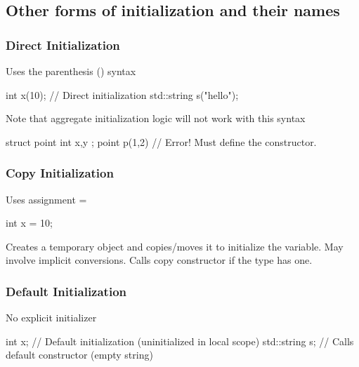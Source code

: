 \documentclass{report}
\begin{document}
    \bigbreak \noindent 
    \subsection{Other forms of initialization and their names}
    \bigbreak \noindent 
    \subsubsection{ Direct Initialization}
    \bigbreak \noindent 
    Uses the parenthesis () syntax
    \bigbreak \noindent 
    \begin{cppcode}
        int x(10);   // Direct initialization
        std::string s("hello");
    \end{cppcode}
    \bigbreak \noindent 
    Note that aggregate initialization logic  will not work with this syntax
    \bigbreak \noindent 
    \begin{cppcode}
        struct point{
            int x,y
        };
        point p(1,2) // Error! Must define the constructor.
    \end{cppcode}

    \bigbreak \noindent 
    \subsubsection{Copy Initialization }
    \bigbreak \noindent 
    Uses assignment =
    \bigbreak \noindent 
    \begin{cppcode}
    int x = 10;
    \end{cppcode}
    \bigbreak \noindent 
    Creates a temporary object and copies/moves it to initialize the variable. May involve implicit conversions. Calls copy constructor if the type has one.

    \bigbreak \noindent 
    \subsubsection{ Default Initialization}
    \bigbreak \noindent 
    No explicit initializer
    \bigbreak \noindent 
    \begin{cppcode}
        int x;      // Default initialization (uninitialized in local scope)
        std::string s; // Calls default constructor (empty string)
    \end{cppcode}



\end{document}
